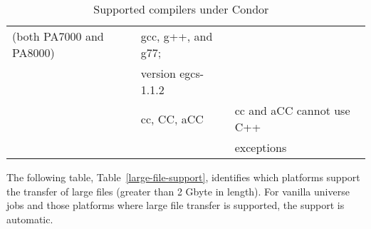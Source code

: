 \begin{center}
\begin{table}[hbt]
\begin{tabular}{|ll|l|}
(both PA7000 and PA8000) & gcc, g++, and g77; \\
& version egcs-1.1.2 \\ 
& cc, CC, aCC & cc and aCC cannot use C++ \\
& & exceptions \\ 
\hline
\end{tabular}
\caption{\label{supported-compile}Supported compilers under Condor \VersionNotice\ }
\end{table}
\end{center}

The following table, 
Table~\ref{large-file-support},
identifies which platforms support
the transfer of large files (greater than 2 Gbyte in length).
For vanilla universe jobs and those platforms where large file transfer is
supported, the support is automatic.


